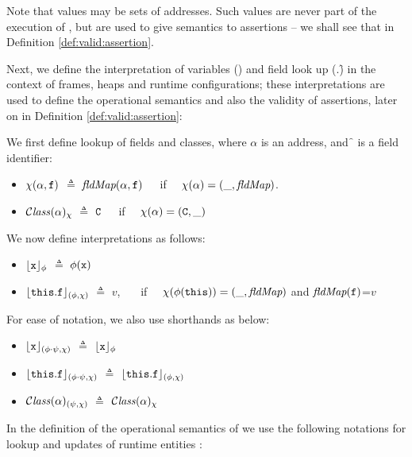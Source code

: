 Note that values may be sets of addresses. Such values are never part of the execution of \LangOO, but are used to give semantics to assertions -- we shall see that in Definition \ref{def:valid:assertion}.



Next, we define the interpretation of variables (\x) and   field look up  (\this.\f)
in the context of frames,
heaps and runtime configurations; these interpretations are used to define the operational semantics and  also  the
validity of assertions, later on in Definition \ref{def:valid:assertion}:

\begin{definition}[Interpretations]
We first define lookup of fields and classes, where $\alpha$ is an address, and \f\, is a field identifier:
\begin{itemize}
\item
$\chi ({\alpha},{{\mbox{\tt{f}}}})$ $\triangleq$  $\textit{fldMap}({\alpha},{{\mbox{\tt{f}}}})$\ \ \ if \ \ $\chi(\alpha)=(\_, \textit{fldMap})$.
\item
${\mathcal C}{\mathit{lass}}(\alpha)_{\chi} $ $\triangleq$ ${\mbox{\tt{C}}}$\  \ \ if \ \ $\chi(\alpha)=({\mbox{\tt{C}}},\_)$
\end{itemize}

\noindent
We now define interpretations  as follows:

\begin{itemize}
\item
${\lfloor{ {{\mbox{\tt{x}}}}}\rfloor_{\phi}} $ $\triangleq$ $\phi({\mbox{\tt{x}}})$
\item
${\lfloor{ {{\mbox{\tt{this}}}.{\mbox{\tt{f}}}}}\rfloor_{(\phi,\chi)}} $ $\triangleq$ $v$, \ \ \ if \ \ $\chi(\phi({\mbox{\tt{this}}}))=(\_, \textit{fldMap})$ and $\textit{fldMap}({\mbox{\tt{f}}})$=$v$

\end{itemize}

\noindent
For ease of notation, we also use shorthands as below:
\begin{itemize}
\item
${\lfloor{ {{\mbox{\tt{x}}}}}\rfloor_{(\phi\cdot\psi,\chi)}} $ $\triangleq$ ${\lfloor{ {{\mbox{\tt{x}}}}}\rfloor_{\phi}} $
\item
${\lfloor{ {{\mbox{\tt{this}}}.{\mbox{\tt{f}}}}}\rfloor_{(\phi\cdot\psi,\chi)}} $ $\triangleq$ ${\lfloor{ {{\mbox{\tt{this}}}.{\mbox{\tt{f}}}}}\rfloor_{(\phi,\chi)}} $
\item
${\mathcal C}{\mathit{lass}}(\alpha)_{(\psi,\chi)} $ $\triangleq$ ${\mathcal C}{\mathit{lass}}(\alpha)_{\chi} $
\end{itemize}

\end{definition}

In the definition of the operational semantics of \LangOO we use the following notations for lookup and updates of runtime entities :

